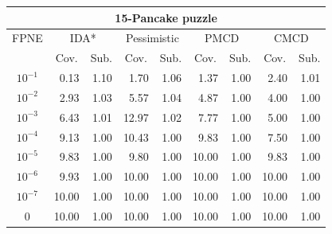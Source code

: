 \documentclass{article}
\begin{document}
\begin{table}[t]
\centering
\footnotesize
\setlength{\tabcolsep}{4.0 pt}
\begin{tabular}{| c | r  r | r  r | r  r | r  r |}
\hline
\multicolumn{9}{|c|}{\textbf{15-Pancake puzzle}} \\
\hline
FPNE     & \multicolumn{2}{|c|}{IDA*}    & \multicolumn{2}{|c|}{Pessimistic}     & \multicolumn{2}{|c|}{PMCD}    & \multicolumn{2}{|c|}{CMCD}    \\
\hline
        & \multicolumn{1}{c}{Cov.} & \multicolumn{1}{c|}{Sub.}        & \multicolumn{1}{c}{Cov.} & \multicolumn{1}{c|}{Sub.}        & \multicolumn{1}{c}{Cov.} & \multicolumn{1}{c|}{Sub.}        & \multicolumn{1}{c}{Cov.} & \multicolumn{1}{c|}{Sub.}        \\
\hline
$10^{-1}$        & 0.13  & 1.10  & 1.70         & 1.06         & 1.37         & 1.00         & 2.40         & 1.01        \\
$10^{-2}$        & 2.93  & 1.03  & 5.57         & 1.04         & 4.87         & 1.00         & 4.00         & 1.00        \\
$10^{-3}$        & 6.43  & 1.01  & 12.97        & 1.02         & 7.77         & 1.00         & 5.00  & 1.00 \\
$10^{-4}$        & 9.13  & 1.00  & 10.43       & 1.00         & 9.83         & 1.00        & 7.50  & 1.00 \\
$10^{-5}$        & 9.83  & 1.00  & 9.80  & 1.00  & 10.00        & 1.00         & 9.83         & 1.00        \\
$10^{-6}$	 & 9.93	 & 1.00	 & 10.00	 & 1.00	 & 10.00	 & 1.00	 & 10.00	 & 1.00	\\
$10^{-7}$	 & 10.00	 & 1.00	 & 10.00	 & 1.00	 & 10.00	 & 1.00	 & 10.00	 & 1.00	\\
0        & 10.00         & 1.00          & 10.00        & 1.00         & 10.00        & 1.00         & 10.00        & 1.00        \\

\end{tabular}
\end{table}
\end{document}
